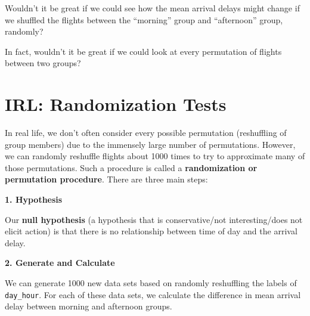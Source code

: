 \documentclass[]{book}
\newenvironment{Shaded}{\begin{snugshade}}{\end{snugshade}}
\newcommand{\CommentTok}[1]{\textcolor[rgb]{0.56,0.35,0.01}{\textit{#1}}}
\newcommand{\DataTypeTok}[1]{\textcolor[rgb]{0.13,0.29,0.53}{#1}}
\newcommand{\DecValTok}[1]{\textcolor[rgb]{0.00,0.00,0.81}{#1}}
\newcommand{\KeywordTok}[1]{\textcolor[rgb]{0.13,0.29,0.53}{\textbf{#1}}}
\newcommand{\NormalTok}[1]{#1}
\newcommand{\OperatorTok}[1]{\textcolor[rgb]{0.81,0.36,0.00}{\textbf{#1}}}
\newcommand{\StringTok}[1]{\textcolor[rgb]{0.31,0.60,0.02}{#1}}
\begin{document}
Wouldn't it be great if we could see how the mean arrival delays might change if we shuffled the flights between the ``morning'' group and ``afternoon'' group, randomly?

In fact, wouldn't it be great if we could look at every permutation of flights between two groups?

\hypertarget{irl-randomization-tests}{%
\section{IRL: Randomization Tests}\label{irl-randomization-tests}}

In real life, we don't often consider every possible permutation (reshuffling of group members) due to the immensely large number of permutations. However, we can randomly reshuffle flights about 1000 times to try to approximate many of those permutations. Such a procedure is called a \textbf{randomization or permutation procedure}. There are three main steps:

\textbf{1. Hypothesis}

Our \textbf{null hypothesis} (a hypothesis that is conservative/not interesting/does not elicit action) is that there is no relationship between time of day and the arrival delay.

\textbf{2. Generate and Calculate}

We can generate 1000 new data sets based on randomly reshuffling the labels of \texttt{day\_hour}. For each of these data sets, we calculate the difference in mean arrival delay between morning and afternoon groups.

\begin{Shaded}
\end{Shaded}
\end{document}
